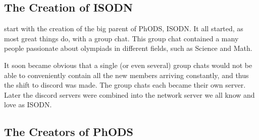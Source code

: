 \subsection{The Creation of ISODN}
 start with the creation of the big parent of PhODS, ISODN.
It all started, as most great things do, with a group chat.
This group chat contained a many people passionate about olympiads in different fields, such as Science and Math.

It soon became obvious that a single (or even several) group chats would not be able to conveniently contain all the new members arriving constantly, and thus the shift to discord was made.
The group chats each became their own server. Later the discord servers were combined into the network server we all know and love
as ISODN.

\subsection{The Creators of PhODS}
